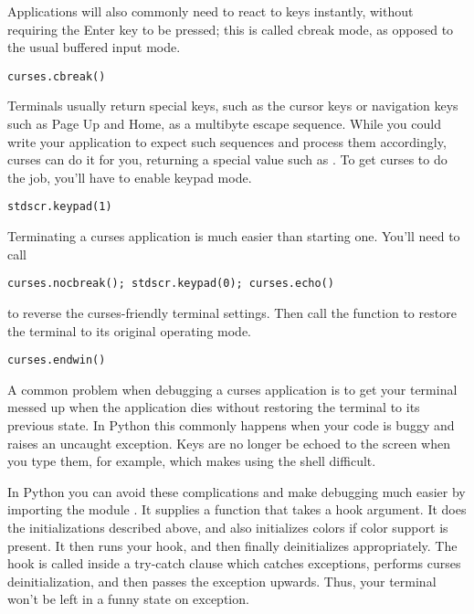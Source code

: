 \documentclass{howto}
\begin{document}
Applications will also commonly need to react to keys instantly,
without requiring the Enter key to be pressed; this is called cbreak
mode, as opposed to the usual buffered input mode.

\begin{verbatim}
curses.cbreak()
\end{verbatim}

Terminals usually return special keys, such as the cursor keys or
navigation keys such as Page Up and Home, as a multibyte escape
sequence.  While you could write your application to expect such
sequences and process them accordingly, curses can do it for you,
returning a special value such as .  To get
curses to do the job, you'll have to enable keypad mode.

\begin{verbatim}
stdscr.keypad(1)
\end{verbatim}

Terminating a curses application is much easier than starting one.
You'll need to call 

\begin{verbatim}
curses.nocbreak(); stdscr.keypad(0); curses.echo()
\end{verbatim}

to reverse the curses-friendly terminal settings. Then call the
 function to restore the terminal to its original
operating mode.

\begin{verbatim}
curses.endwin()
\end{verbatim}

A common problem when debugging a curses application is to get your
terminal messed up when the application dies without restoring the
terminal to its previous state.  In Python this commonly happens when
your code is buggy and raises an uncaught exception.  Keys are no
longer be echoed to the screen when you type them, for example, which
makes using the shell difficult.

In Python you can avoid these complications and make debugging much
easier by importing the module .  It supplies a
function  that takes a hook argument.  It does the
initializations described above, and also initializes colors if color
support is present.  It then runs your hook, and then finally
deinitializes appropriately.  The hook is called inside a try-catch
clause which catches exceptions, performs curses deinitialization, and
then passes the exception upwards.  Thus, your terminal won't be left
in a funny state on exception.
\end{document}

